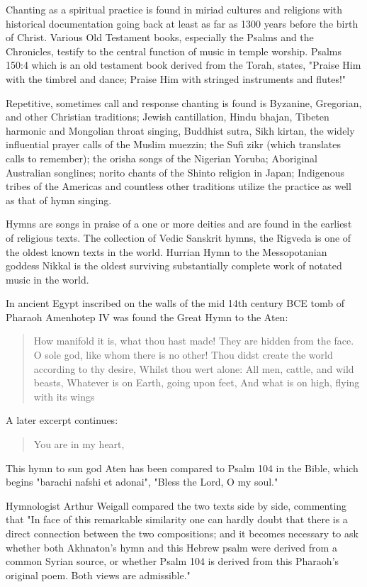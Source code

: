 \documentclass[12pt]{article}
\begin{document}
Chanting as a spiritual practice is found in miriad cultures and religions with historical documentation going back at least as far as 1300 years before the birth of Christ. Various Old Testament books, especially the Psalms and the Chronicles, testify to the central function of music in temple worship. Psalms 150:4 which is an old testament book derived from the Torah, states, "Praise Him with the timbrel and dance; Praise Him with stringed instruments and flutes!"

Repetitive, sometimes call and response chanting is found is Byzanine, Gregorian, and other Christian traditions; Jewish cantillation, Hindu bhajan, Tibeten harmonic and Mongolian throat singing, Buddhist sutra, Sikh kirtan, the widely influential prayer calls of the Muslim muezzin; the Sufi zikr (which translates calls to remember); the orisha songs of the Nigerian Yoruba; Aboriginal Australian songlines; norito chants of the Shinto religion in Japan; Indigenous tribes of the Americas and countless other traditions utilize the practice as well as that of hymn singing.

Hymns are songs in praise of a one or more deities and are found in the earliest of religious texts. The collection of Vedic Sanskrit hymns, the Rigveda is one of the oldest known texts in the world. Hurrian Hymn to the Messopotanian goddess Nikkal is the oldest surviving substantially complete work of notated music in the world.

In ancient Egypt inscribed on the walls of the mid 14th century BCE tomb of Pharaoh Amenhotep IV was found the Great Hymn to the Aten:

\begin{quote}
How manifold it is, what thou hast made!
They are hidden from the face.
O sole god, like whom there is no other!
Thou didst create the world according to thy desire,
Whilst thou wert alone: All men, cattle, and wild beasts,
Whatever is on Earth, going upon feet,
And what is on high, flying with its wings
\end{quote}

A later excerpt continues:

\begin{quote}
You are in my heart,
\end{quote}

This hymn to sun god Aten has been compared to Psalm 104 in the Bible, which begins "barachi nafshi et adonai", "Bless the Lord, O my soul."

Hymnologist Arthur Weigall compared the two texts side by side, commenting that "In face of this remarkable similarity one can hardly doubt that there is a direct connection between the two compositions; and it becomes necessary to ask whether both Akhnaton's hymn and this Hebrew psalm were derived from a common Syrian source, or whether Psalm 104 is derived from this Pharaoh's original poem. Both views are admissible."
\end{document}
